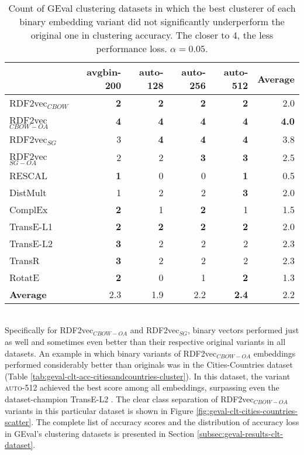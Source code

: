 \documentclass[11pt,titlepage,oneside,openany]{book}
\begin{document}
\begin{table}[h!]
\centering
\begin{tabular}{lrrrrr}
\toprule
{} &  avgbin-200 &  auto-128 &  auto-256 &  auto-512 &  \textbf{Average} \\
\midrule
RDF2vec$_{CBOW}$     &	\textbf{2} &	\textbf{2} &	\textbf{2} &	\textbf{2} & 2.0 \\
RDF2vec$_{CBOW-OA}$  &	\textbf{4} &	\textbf{4} &	\textbf{4} &	\textbf{4} & \textbf{4.0} \\
RDF2vec$_{SG}$       &           3  &	\textbf{4} &	\textbf{4} &	\textbf{4} & 3.8 \\
RDF2vec$_{SG-OA}$    &           2  &         2  &	\textbf{3} &	\textbf{3} & 2.5 \\
RESCAL               &	\textbf{1} &         0  &         0  &	\textbf{1} & 0.5 \\
DistMult             &           1  &         2  &         2  &	\textbf{3} & 2.0 \\
ComplEx              &	\textbf{2} &         1  &	\textbf{2} &         1  & 1.5 \\
TransE-L1            &	\textbf{2} &	\textbf{2} &	\textbf{2} &	\textbf{2} & 2.0 \\
TransE-L2            &	\textbf{3} &         2  &         2  &         2  & 2.3 \\
TransR               &	\textbf{3} &         2  &         2  &         2  & 2.3 \\
RotatE               &	\textbf{2} &         0  &         1  &	\textbf{2} & 1.3 \\
\midrule
\textbf{Average}     &        2.3  &      1.9  &      2.2  &	\textbf{2.4} & 2.2 \\
\bottomrule
\end{tabular}
\caption{Count of GEval clustering datasets in which the best clusterer of each binary embedding variant did not significantly underperform the original one in clustering accuracy. The closer to 4, the less performance loss. $\alpha=0.05$.}
\label{tab:geval-clt-acc-significantly-not-worse}
\end{table}
\\
Specifically for RDF2vec$_{CBOW-OA}$ and RDF2vec$_{SG}$, binary vectors performed just as well and sometimes even better than their respective original variants in all datasets. An example in which binary variants of RDF2vec$_{CBOW-OA}$ embeddings performed considerably better than originals was in the Cities-Countries dataset (Table \ref{tab:geval-clt-acc-citiesandcountries-cluster}). In this dataset, the variant \textsc{auto-512} achieved the best score among all embeddings, surpassing even the dataset-champion TransE-L2 \cite{portisch_rdf2vec_2023}. The clear class separation of RDF2vec$_{CBOW-OA}$ variants in this particular dataset is shown in Figure \ref{fig:geval-clt-cities-countries-scatter}. The complete list of accuracy scores and the distribution of accuracy loss in GEval's clustering datasets is presented in Section \ref{subsec:geval-results-clt-dataset}.\\
\end{document}
